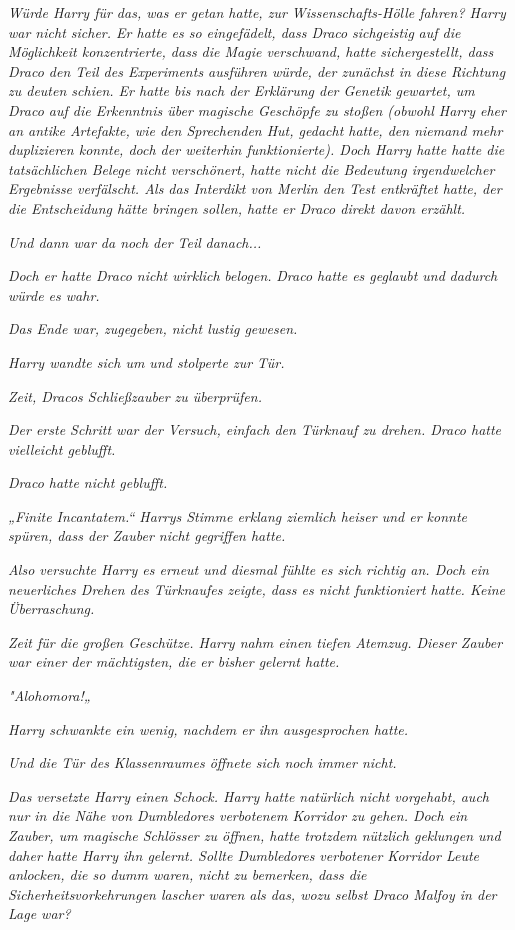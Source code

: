 {\emph{Würde Harry für das, was er getan hatte, zur Wissenschafts-Hölle fahren? Harry war nicht sicher. Er hatte es so eingefädelt, dass Draco} \emph{sichgeistig} \emph{auf die Möglichkeit konzentrierte, dass die Magie verschwand, hatte sichergestellt, dass Draco den Teil des Experiments ausführen würde, der zunächst in diese Richtung zu deuten schien. Er hatte bis nach der Erklärung der Genetik gewartet, um Draco auf die Erkenntnis über magische Geschöpfe zu stoßen (obwohl Harry eher an antike Artefakte, wie den Sprechenden Hut, gedacht hatte, den niemand mehr duplizieren konnte, doch der weiterhin funktionierte). Doch Harry hatte hatte die tatsächlichen Belege nicht verschönert, hatte nicht die Bedeutung irgendwelcher Ergebnisse verfälscht. Als das Interdikt von Merlin den Test entkräftet hatte, der die Entscheidung hätte bringen sollen, hatte er Draco direkt davon erzählt.}

\emph{Und dann war da noch der Teil} \emph{\emph{danach...}}

\emph{Doch er hatte Draco nicht wirklich} \emph{\emph{belogen.}} \emph{Draco hatte es geglaubt und} \emph{\emph{dadurch würde es wahr.}}

\emph{Das Ende war, zugegeben, nicht lustig gewesen.}

\emph{Harry wandte sich um und stolperte zur Tür.}

\emph{Zeit, Dracos Schließzauber zu überprüfen.}

\emph{Der erste Schritt war der Versuch, einfach den Türknauf zu drehen. Draco hatte vielleicht geblufft.}

\emph{Draco hatte nicht geblufft.}

\emph{„\emph{Finite Incantatem.}“ Harrys Stimme erklang ziemlich heiser und er konnte spüren, dass der Zauber nicht gegriffen hatte.}

\emph{Also versuchte Harry es erneut und diesmal fühlte es sich richtig an. Doch ein neuerliches Drehen des Türknaufes zeigte, dass es nicht funktioniert hatte. Keine Überraschung.}

\emph{Zeit für die großen Geschütze. Harry nahm einen tiefen Atemzug. Dieser Zauber war einer der mächtigsten, die er bisher gelernt hatte.}

\emph{"\emph{Alohomora!}„}

\emph{Harry schwankte ein wenig, nachdem er ihn ausgesprochen hatte.}

\emph{Und die Tür des Klassenraumes öffnete sich noch immer nicht.}

\emph{Das versetzte Harry einen Schock. Harry hatte natürlich nicht vorgehabt, auch nur in die Nähe von Dumbledores verbotenem Korridor zu gehen. Doch ein Zauber, um magische Schlösser zu öffnen, hatte trotzdem nützlich geklungen und daher hatte Harry ihn gelernt. Sollte Dumbledores verbotener Korridor Leute anlocken, die so dumm waren, nicht zu bemerken, dass die Sicherheitsvorkehrungen lascher waren als das, wozu selbst Draco Malfoy in der Lage war?}

}
